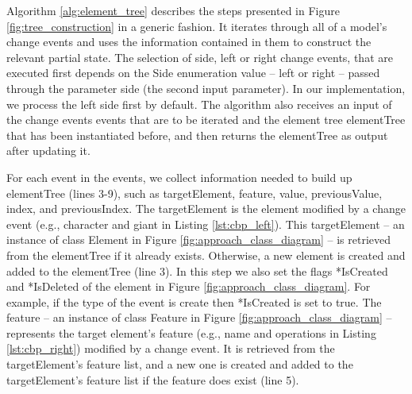 Algorithm \ref{alg:element_tree} describes the steps presented in Figure \ref{fig:tree_construction} in a generic fashion. It iterates through all of a model's change events and uses the information contained in them to construct the relevant partial state. The selection of side, left or right change events, that are executed first depends on the \textsf{Side} enumeration value -- \textsf{left} or \textsf{right} -- passed through the parameter \textsf{side} (the second input parameter). In our implementation, we process the left side first by default. The algorithm also receives an input of the change events \textsf{events} that are to be iterated and the element tree \textsf{elementTree} that has been instantiated before, and then returns the \textsf{elementTree} as output after updating it.

For each \textsf{event} in the \textsf{events}, we collect information needed to build up \textsf{elementTree}  (lines 3-9), such as \textsf{targetElement}, \textsf{feature}, \textsf{value}, \textsf{previousValue}, \textsf{index}, and \textsf{previousIndex}. The \textsf{targetElement} is the element modified by a change event (e.g., \textsf{character} and \textsf{giant} in Listing \ref{lst:cbp_left}). This \textsf{targetElement} -- an instance of class Element in Figure \ref{fig:approach_class_diagram} -- is retrieved from the \textsf{elementTree} if it already exists. Otherwise, a new element is created and added to the \textsf{elementTree} (line 3). In this step we also set the flags \textsf{*IsCreated} and \textsf{*IsDeleted} of the element in Figure \ref{fig:approach_class_diagram}. For example, if the type of the event is \textsf{create} then \textsf{*IsCreated} is set to \textsf{true}. The \textsf{feature} -- an instance of class Feature in Figure \ref{fig:approach_class_diagram} -- represents the target element's feature (e.g., \textsf{name} and \textsf{operations} in Listing \ref{lst:cbp_right}) modified by a change event. It is retrieved from the \textsf{targetElement}'s feature list, and a new one is created and added to the \textsf{targetElement}'s feature list if the feature does exist (line 5). 

